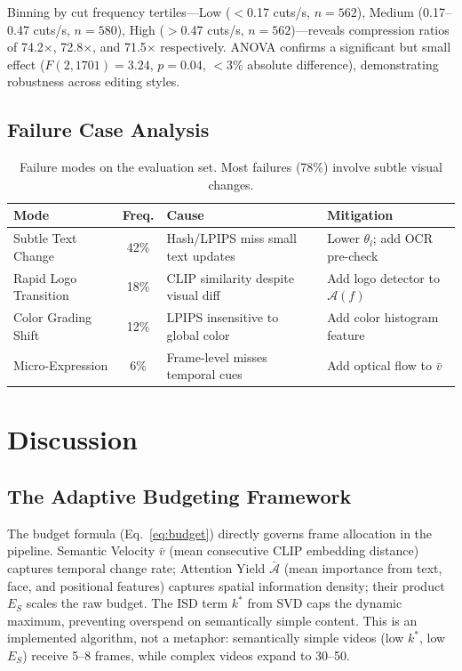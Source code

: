 \documentclass[sigconf,nonacm]{acmart}
\begin{document}
Binning by cut frequency tertiles---Low ($<$0.17 cuts/s, $n=562$), Medium (0.17--0.47 cuts/s, $n=580$), High ($>$0.47 cuts/s, $n=562$)---reveals compression ratios of 74.2$\times$, 72.8$\times$, and 71.5$\times$ respectively. ANOVA confirms a significant but small effect ($F(2, 1701) = 3.24$, $p = 0.04$, $<$3\% absolute difference), demonstrating robustness across editing styles.

\subsection{Failure Case Analysis}

\begin{table}[t]
\centering
\caption{Failure modes on the evaluation set. Most failures (78\%) involve subtle visual changes.}
\label{tab:failures}
\begin{tabular}{@{}lcp{5.5cm}p{5.5cm}@{}}
\toprule
\textbf{Mode} & \textbf{Freq.} & \textbf{Cause} & \textbf{Mitigation} \\
\midrule
Subtle Text Change    & 42\% & Hash/LPIPS miss small text updates    & Lower $\theta_l$; add OCR pre-check \\
Rapid Logo Transition & 18\% & CLIP similarity despite visual diff    & Add logo detector to $\mathcal{A}(f)$ \\
Color Grading Shift   & 12\% & LPIPS insensitive to global color      & Add color histogram feature \\
Micro-Expression      &  6\% & Frame-level misses temporal cues        & Add optical flow to $\bar{v}$ \\
\bottomrule
\end{tabular}
\end{table}

\section{Discussion}
\label{sec:discussion}

\subsection{The Adaptive Budgeting Framework}

The budget formula (Eq.~\ref{eq:budget}) directly governs frame allocation in the pipeline. Semantic Velocity $\bar{v}$ (mean consecutive CLIP embedding distance) captures temporal change rate; Attention Yield $\bar{\mathcal{A}}$ (mean importance from text, face, and positional features) captures spatial information density; their product $E_S$ scales the raw budget. The ISD term $k^*$ from SVD caps the dynamic maximum, preventing overspend on semantically simple content. This is an implemented algorithm, not a metaphor: semantically simple videos (low $k^*$, low $E_S$) receive 5--8 frames, while complex videos expand to 30--50.
\end{document}
